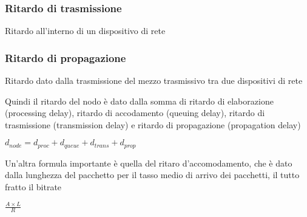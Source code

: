 \documentclass[12pt, a4paper]{article}
\begin{document}
\subsubsection*{Ritardo di trasmissione}
Ritardo all'interno di un dispositivo di rete

\subsubsection*{Ritardo di propagazione}
Ritardo dato dalla trasmissione del mezzo trasmissivo tra due dispositivi di rete


Quindi il ritardo del nodo è dato dalla somma di ritardo di elaborazione (processing delay), ritardo di accodamento 
(queuing delay), ritardo di trasmissione (transmission delay) e ritardo di propagazione (propagation delay)
\begin{center}
    $d_{node}=d_{proc}+d_{queue}+d_{trans}+d_{prop}$
\end{center}

Un'altra formula importante è quella del ritaro d'accomodamento, che è dato dalla lunghezza del pacchetto per il tasso 
medio di arrivo dei pacchetti, il tutto fratto il bitrate
\begin{center}
    $\frac{A\times L}{R}$
\end{center}
\end{document}

